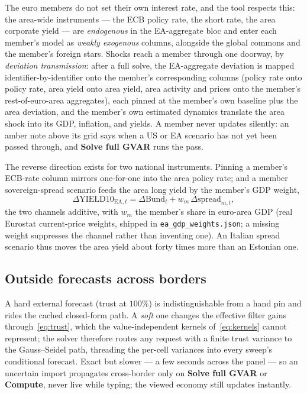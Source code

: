 \documentclass[11pt]{article}
\newcommand{\ui}[1]{\textbf{#1}}
\theoremstyle{plain}
\theoremstyle{remark}
\begin{document}
The euro members do not set their own interest rate, and the tool
respects this: the area-wide instruments --- the ECB policy rate, the
short rate, the area corporate yield --- are \emph{endogenous} in the
EA-aggregate bloc and enter each member's model as \emph{weakly
exogenous} columns, alongside the global commons and the member's
foreign stars. Shocks reach a member through one doorway, by
\emph{deviation transmission}: after a full solve, the EA-aggregate
deviation is mapped identifier-by-identifier onto the member's
corresponding columns (policy rate onto policy rate, area yield onto
area yield, area activity and prices onto the member's rest-of-euro-area
aggregates), each pinned at the member's own baseline plus the area
deviation, and the member's own estimated dynamics translate the area
shock into its GDP, inflation, and yields. A member never updates
silently: an amber note above its grid says when a US or EA scenario has
not yet been passed through, and \ui{Solve full GVAR} runs the pass.

The reverse direction exists for two national instruments. Pinning a
member's ECB-rate column mirrors one-for-one into the area policy rate;
and a member sovereign-spread scenario feeds the area long yield by the
member's GDP weight,
\begin{equation}\label{eq:spread}
  \Delta \text{YIELD10}_{\text{EA},t}
  = \Delta\text{Bund}_t + w_{m}\,\Delta\text{spread}_{m,t},
\end{equation}
the two channels additive, with $w_m$ the member's share in euro-area
GDP (real Eurostat current-price weights, shipped in
\texttt{ea\_gdp\_weights.json}; a missing weight suppresses the channel
rather than inventing one). An Italian spread scenario thus moves the
area yield about forty times more than an Estonian one.

\subsection{Outside forecasts across borders}\label{sec:gvarsoft}

A hard external forecast (trust at $100\%$) is indistinguishable from a
hand pin and rides the cached closed-form path. A \emph{soft} one
changes the effective filter gains through~\eqref{eq:trust}, which the
value-independent kernels of~\eqref{eq:kernels} cannot represent; the
solver therefore routes any request with a finite trust variance to the
Gauss--Seidel path, threading the per-cell variances into every sweep's
conditional forecast. Exact but slower --- a few seconds across the
panel --- so an uncertain import propagates cross-border only on
\ui{Solve full GVAR} or \ui{Compute}, never live while typing; the
viewed economy still updates instantly.
\end{document}
